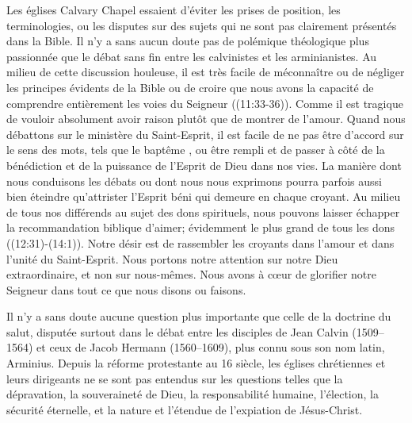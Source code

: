 Les églises Calvary Chapel essaient \pocketlinebreak
 d'éviter les prises de position, les terminologies,
 ou les disputes
 sur des sujets qui ne sont pas clairement présentés dans la Bible.
 Il n'y a sans aucun doute pas de polémique théologique plus passionnée que le débat sans fin
 entre les calvinistes et les arminianistes. Au milieu de cette discussion houleuse,
 il est très facile de méconnaître ou de négliger les principes évidents de la Bible
 ou de croire que nous avons la capacité de comprendre entièrement les voies du Seigneur
 ((11:33-36)).
 Comme il est tragique de vouloir absolument avoir raison plutôt que de montrer de l'amour.
 Quand nous débattons sur le ministère du Saint-Esprit, il est facile de ne pas être d'accord
 sur le sens des mots, tels que le \og baptême \fg{}, ou \og être rempli \fg{} 
 et de passer à côté de la bénédiction et de la puissance de l'Esprit de Dieu dans nos vies.
 La manière dont nous conduisons les débats ou dont nous nous exprimons pourra parfois
 aussi bien \og éteindre \fg{}  qu'\og attrister\fg{} 
 l'Esprit béni qui demeure en chaque croyant.
 Au milieu de tous nos différends au sujet des dons spirituels,
 nous pouvons laisser échapper la recommandation biblique d'aimer;
 évidemment le plus grand de tous les dons ((12:31)-(14:1)).
 Notre désir est de rassembler les croyants dans l'amour et dans l'unité du Saint-Esprit.
 Nous portons notre attention sur notre Dieu extraordinaire, et non sur
 nous-mêmes.
 Nous avons à cœur de glorifier notre Seigneur dans tout ce que nous disons ou faisons.

Il n'y a sans doute aucune question plus importante que celle de la doctrine du salut,
 disputée surtout dans le débat entre les disciples de Jean Calvin (1509--1564)
 et ceux de Jacob Hermann \pocketlinebreak (1560--1609), plus connu sous son nom latin, Arminius.
 Depuis la réforme protestante au 16 siècle, les églises chrétiennes
 et leurs dirigeants ne se sont pas entendus sur les questions telles que la dépravation,
 la souveraineté de Dieu, la responsabilité humaine, l'élection, la sécurité éternelle,
 et la nature et l'étendue de l'expiation de Jésus-Christ.


